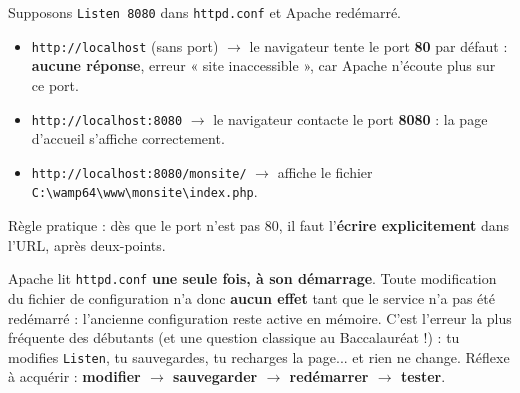 \documentclass[11pt]{article}
\begin{document}
\begin{exemplebox}
Supposons \texttt{Listen 8080} dans \texttt{httpd.conf} et Apache redémarré.
\begin{itemize}
  \item \texttt{http://localhost} (sans port) $\rightarrow$ le navigateur tente le port \textbf{80} par défaut : \textbf{aucune réponse}, erreur « site inaccessible », car Apache n'écoute plus sur ce port.
  \item \texttt{http://localhost:8080} $\rightarrow$ le navigateur contacte le port \textbf{8080} : la page d'accueil s'affiche correctement.
  \item \texttt{http://localhost:8080/monsite/} $\rightarrow$ affiche le fichier \texttt{C:\textbackslash wamp64\textbackslash www\textbackslash monsite\textbackslash index.php}.
\end{itemize}
Règle pratique : dès que le port n'est pas 80, il faut l'\textbf{écrire explicitement} dans l'URL, après deux-points.
\end{exemplebox}

\begin{attention}
Apache lit \texttt{httpd.conf} \textbf{une seule fois, à son démarrage}. Toute modification du fichier de configuration n'a donc \textbf{aucun effet} tant que le service n'a pas été redémarré : l'ancienne configuration reste active en mémoire. C'est l'erreur la plus fréquente des débutants (et une question classique au Baccalauréat !) : tu modifies \texttt{Listen}, tu sauvegardes, tu recharges la page... et rien ne change. Réflexe à acquérir : \textbf{modifier $\rightarrow$ sauvegarder $\rightarrow$ redémarrer $\rightarrow$ tester}.
\end{attention}
\end{document}

